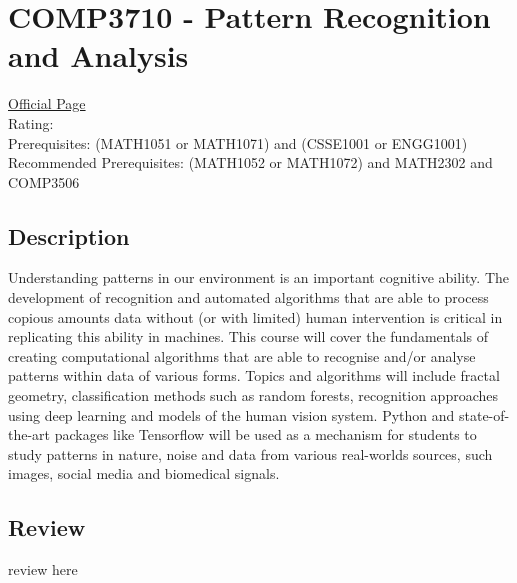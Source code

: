 \hypertarget{COMP3710}{\section{COMP3710 - Pattern Recognition and Analysis}}

\large
\textcolor{turbo_purple}{\href{https://my.uq.edu.au/programs-courses/course.html?course_code=COMP3710}{Official Page}} \\
Rating: \cstar\cstar\cstar\cstar\ostar \\
Prerequisites: 
(MATH1051 or MATH1071) and (CSSE1001 or ENGG1001) \\
Recommended Prerequisites: (MATH1052 or MATH1072) and MATH2302 and COMP3506

\normalsize
\subsection*{Description}
Understanding patterns in our environment is an important cognitive ability.
The development of recognition and automated algorithms that are able to process copious amounts data without (or with limited) human intervention is critical in replicating this ability in machines.
This course will cover the fundamentals of creating computational algorithms that are able to recognise and/or analyse patterns within data of various forms.
Topics and algorithms will include fractal geometry, classification methods such as random forests, recognition approaches using deep learning and models of the human vision system.
Python and state-of-the-art packages like Tensorflow will be used as a mechanism for students to study patterns in nature, noise and data from various real-worlds sources, such images, social media and biomedical signals.

\subsection*{Review}
review here
